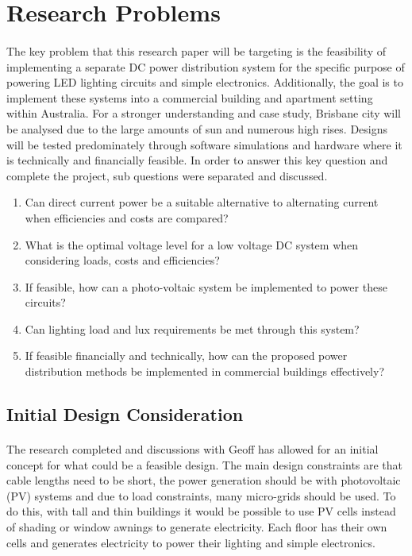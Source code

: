 
\section{Research Problems}

\paragraph{}
The key problem that this research paper will be targeting is the feasibility of implementing a separate DC power distribution system for the specific purpose of powering LED lighting circuits and simple electronics. Additionally, the goal is to implement these systems into a commercial building and apartment setting within Australia. For a stronger understanding and case study, Brisbane city will be analysed due to the large amounts of sun and numerous high rises. Designs will be tested predominately through software simulations and hardware where it is technically and financially feasible. In order to answer this key question and complete the project, sub questions were separated and discussed.

\begin{enumerate}
\itemsep-0.5em 
\item Can direct current power be a suitable alternative to alternating current when efficiencies and costs are compared?
\item What is the optimal voltage level for a low voltage DC system when considering loads, costs and efficiencies?
\item If feasible, how can a photo-voltaic system be implemented to power these circuits?
\item Can lighting load and lux requirements be met through this system?
\item If feasible financially and technically, how can the proposed power distribution methods be implemented in commercial buildings effectively?
\end{enumerate} 

\subsection{Initial Design Consideration}

\paragraph{}
The research completed and discussions with Geoff has allowed for an initial concept for what could be a feasible design. The main design constraints are that cable lengths need to be short, the power generation should be with photovoltaic (PV) systems and due to load constraints, many micro-grids should be used. To do this, with tall and thin buildings it would be possible to use PV cells instead of shading or window awnings to generate electricity. Each floor has their own cells and generates electricity to power their lighting and simple electronics. 

